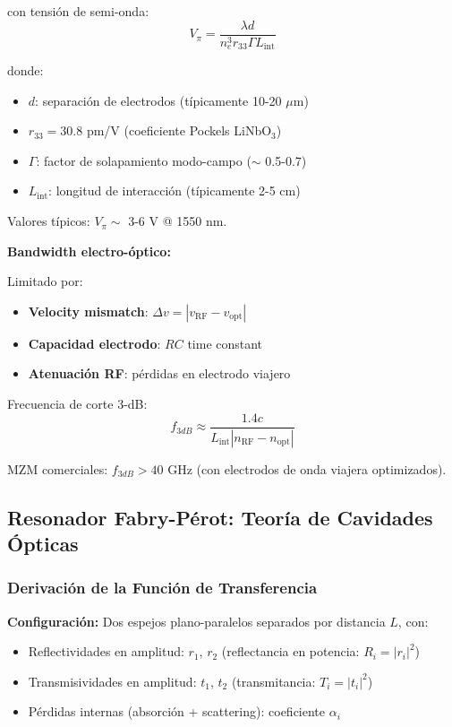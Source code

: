 \documentclass[11pt,a4paper]{article}
\begin{document}
con tensión de semi-onda:
\begin{equation}
    V_\pi = \frac{\lambda d}{n_e^3 r_{33} \Gamma L_{\text{int}}}
\end{equation}

donde:
\begin{itemize}
    \item $d$: separación de electrodos (típicamente 10-20 $\mu$m)
    \item $r_{33} = 30.8$ pm/V (coeficiente Pockels LiNbO$_3$)
    \item $\Gamma$: factor de solapamiento modo-campo ($\sim$ 0.5-0.7)
    \item $L_{\text{int}}$: longitud de interacción (típicamente 2-5 cm)
\end{itemize}

Valores típicos: $V_\pi \sim$ 3-6 V @ 1550 nm.

\textbf{Bandwidth electro-óptico:}

Limitado por:
\begin{itemize}
    \item \textbf{Velocity mismatch}: $\Delta v = |v_{\text{RF}} - v_{\text{opt}}|$
    \item \textbf{Capacidad electrodo}: $RC$ time constant
    \item \textbf{Atenuación RF}: pérdidas en electrodo viajero
\end{itemize}

Frecuencia de corte 3-dB:
\begin{equation}
    f_{3dB} \approx \frac{1.4c}{L_{\text{int}}|n_{\text{RF}} - n_{\text{opt}}|}
\end{equation}

MZM comerciales: $f_{3dB} > 40$ GHz (con electrodos de onda viajera optimizados).

\subsection{Resonador Fabry-Pérot: Teoría de Cavidades Ópticas}

\subsubsection{Derivación de la Función de Transferencia}

\textbf{Configuración:} Dos espejos plano-paralelos separados por distancia $L$, con:
\begin{itemize}
    \item Reflectividades en amplitud: $r_1$, $r_2$ (reflectancia en potencia: $R_i = |r_i|^2$)
    \item Transmisividades en amplitud: $t_1$, $t_2$ (transmitancia: $T_i = |t_i|^2$)
    \item Pérdidas internas (absorción + scattering): coeficiente $\alpha_i$
\end{itemize}
\end{document}
